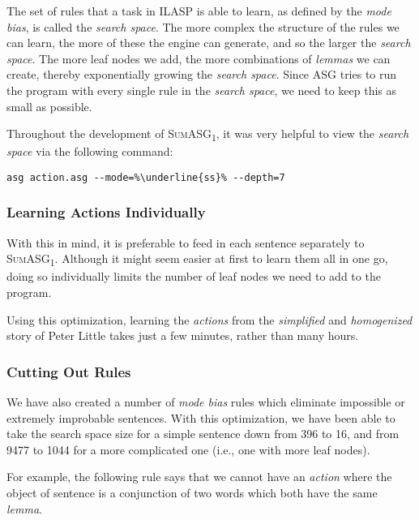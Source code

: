 The set of rules that a task in ILASP is able to learn, as defined by the \textit{mode bias}, is called the \textit{search space}. The more complex the structure of the rules we can learn, the more of these the engine can generate, and so the larger the \textit{search space}. The more leaf nodes we add, the more combinations of \textit{lemmas} we can create, thereby exponentially growing the \textit{search space}. Since ASG tries to run the program with every single rule in the \textit{search space}, we need to keep this as small as possible.

Throughout the development of \textsc{SumASG\textsubscript{1}}, it was very helpful to view the \textit{search space} via the following command:

\begin{displayquote}
\begin{lstlisting}[numbers=none, escapechar=\%]
asg action.asg --mode=%\underline{ss}% --depth=7
\end{lstlisting}
\end{displayquote}

\subsubsection{Learning Actions Individually}

With this in mind, it is preferable to feed in each sentence separately to \textsc{SumASG\textsubscript{1}}. Although it might seem easier at first to learn them all in one go, doing so individually limits the number of leaf nodes we need to add to the program.

Using this optimization, learning the \textit{actions} from the \textit{simplified} and \textit{homogenized} story of Peter Little takes just a few minutes, rather than many hours.

\subsubsection{Cutting Out Rules}

We have also created a number of \textit{mode bias} rules which eliminate impossible or extremely improbable sentences. With this optimization, we have been able to take the search space size for a simple sentence down from 396 to 16, and from 9477 to 1044 for a more complicated one (i.e., one with more leaf nodes).

For example, the following rule says that we cannot have an \textit{action} where the object of sentence is a conjunction of two words which both have the same \textit{lemma}.

